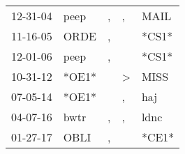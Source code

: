 \begin{supertabular}{p{0.07\textwidth}p{0.06\textwidth}p{0.02\textwidth}p{0.02\textwidth}p{0.06\textwidth}}
 12-31-04\textsuperscript{} &  peep\textsuperscript{} &  , &             , &  MAIL\textsuperscript{} \\
 11-16-05\textsuperscript{} &  ORDE\textsuperscript{} &  , &               &                   *CS1* \\
 12-01-06\textsuperscript{} &  peep\textsuperscript{} &  , &               &                   *CS1* \\
 10-31-12\textsuperscript{} &                   *OE1* &    &  \textgreater &  MISS\textsuperscript{} \\
 07-05-14\textsuperscript{} &                   *OE1* &    &             , &   haj\textsuperscript{} \\
 04-07-16\textsuperscript{} &  bwtr\textsuperscript{} &  , &             , &  ldnc\textsuperscript{} \\
 01-27-17\textsuperscript{} &  OBLI\textsuperscript{} &  , &               &                   *CE1* \\
\end{supertabular}
